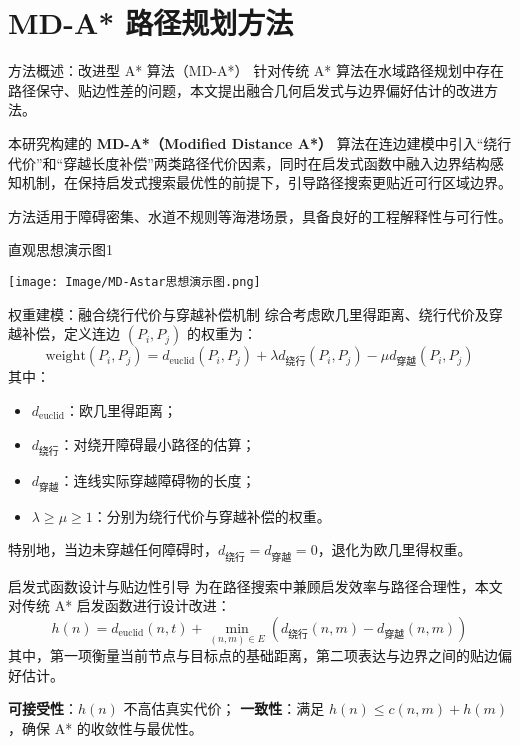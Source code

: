 \section{MD-A* 路径规划方法}

\begin{frame}{方法概述：改进型 A* 算法（MD-A*）}
    \justifying
    针对传统 A* 算法在水域路径规划中存在路径保守、贴边性差的问题，本文提出融合几何启发式与边界偏好估计的改进方法。

    \vspace{0.8em}
    本研究构建的 \textbf{MD-A*（Modified Distance A*）} 算法在连边建模中引入“绕行代价”和“穿越长度补偿”两类路径代价因素，同时在启发式函数中融入边界结构感知机制，在保持启发式搜索最优性的前提下，引导路径搜索更贴近可行区域边界。

    \vspace{0.5em}
    方法适用于障碍密集、水道不规则等海港场景，具备良好的工程解释性与可行性。
\end{frame}

\begin{frame}[plain]{直观思想演示图1}
  \begin{center}
    \texttt{[image: Image/MD-Astar思想演示图.png]}
  \end{center}
\end{frame}


\begin{frame}{权重建模：融合绕行代价与穿越补偿机制}
    \justifying
    综合考虑欧几里得距离、绕行代价及穿越补偿，定义连边 $(P_i, P_j)$ 的权重为：
    \[
    \text{weight}(P_i, P_j) = d_{\text{euclid}}(P_i, P_j) + \lambda d_{\text{绕行}}(P_i, P_j) - \mu d_{\text{穿越}}(P_i, P_j)
    \]
    其中：
    \begin{itemize}
      \item $d_{\text{euclid}}$：欧几里得距离；
      \item $d_{\text{绕行}}$：对绕开障碍最小路径的估算；
      \item $d_{\text{穿越}}$：连线实际穿越障碍物的长度；
      \item $\lambda \geq \mu \geq 1$：分别为绕行代价与穿越补偿的权重。
    \end{itemize}
    特别地，当边未穿越任何障碍时，$d_{\text{绕行}} = d_{\text{穿越}} = 0$，退化为欧几里得权重。
\end{frame}

\begin{frame}{启发式函数设计与贴边性引导}
    \justifying
    为在路径搜索中兼顾启发效率与路径合理性，本文对传统 A* 启发函数进行设计改进：
    \[
    h(n) = d_{\text{euclid}}(n, t) + \min_{(n,m)\in E} \left( d_{\text{绕行}}(n,m) - d_{\text{穿越}}(n,m) \right)
    \]
    其中，第一项衡量当前节点与目标点的基础距离，第二项表达与边界之间的贴边偏好估计。

    \vspace{0.5em}
    \textbf{可接受性}：$h(n)$ 不高估真实代价；
    \textbf{一致性}：满足 $h(n) \leq c(n,m) + h(m)$，确保 A* 的收敛性与最优性。
\end{frame}


